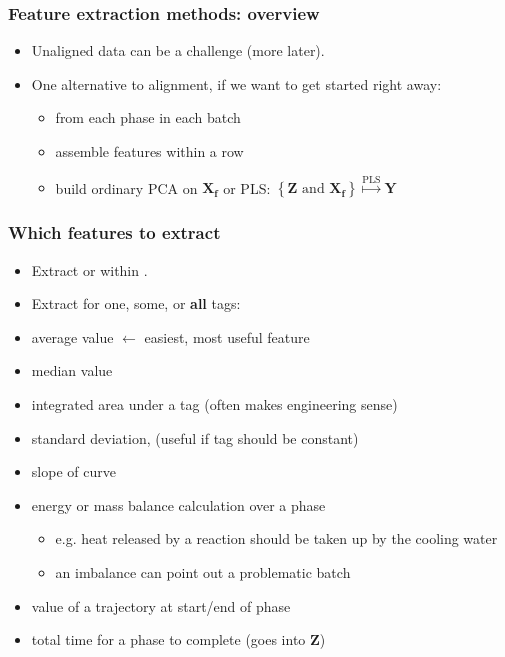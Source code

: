 \begin{frame}\frametitle{Feature extraction methods: overview}

\begin{itemize}
	\item	Unaligned data can be a challenge (more later).
	
	\item	One alternative to alignment, if we want to get started right away: 
	
			\begin{itemize}
				\item	{} from each phase in each batch
				
				\item	assemble features within a row
				
				\item	build ordinary PCA on \( \mathbf{X_f} \) or PLS: \( \left\{ \mathbf{Z} \,\,\text{and}\,\, \mathbf{X_f}\right\} \stackrel{\text{PLS}}{\longmapsto} \mathbf{Y} \)
			\end{itemize}
			
\end{itemize}
\end{frame}

\begin{frame}\frametitle{Which features to extract}

\begin{itemize}
	\item	Extract {} or within {}. 
	
	\item	Extract for one, some, or \textbf{all} tags:
\end{itemize}\pause

\begin{itemize}
	\item	average value \hfill {\color{myOrange} $\leftarrow$ easiest, most useful feature}
	\item 	median value
	\item	integrated area under a tag (often makes engineering sense)
	\item	standard deviation, (useful if tag should be constant)
	\item	slope of curve\pause
	\item	energy or mass balance calculation over a phase
	 		\begin{itemize}
	 			\item	e.g. heat released by a reaction should be taken up by the cooling water
	 			\item	an imbalance can point out a problematic batch
	 		\end{itemize} \pause
	\item	value of a trajectory at start/end of phase
	\item	total time for a phase to complete (goes into \( \mathbf{Z} \))
\end{itemize}
\end{frame}

